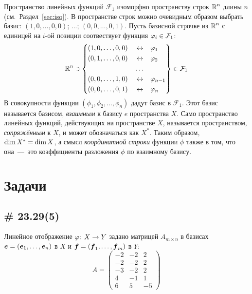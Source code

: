\documentclass[a4paper,12pt]{article}
\begin{document}
  Пространство линейных функций $\mathcal F_1$ изоморфно пространству строк $\operatorname{\mathbb R}^n$ длины $n$ (см.~Раздел~\ref{sec:iso}).
  В пространстве строк можно очевидным образом выбрать базис: $(1, 0, \ldots, 0, 0)$; ...; $(0, 0, \ldots, 0, 1)$.
  Пусть базисной строчке из $\operatorname{\mathbb R}^n$ с единицей на $i$-ой позиции соотвествует функция $\phi_i \hm\in \mathcal F_1$:
  \[
    \RR^n \ni \left\{
      \begin{aligned}
        &(1, 0, \ldots, 0, 0)            & &\leftrightarrow & &\phi_{1\hphantom{-1}}\\
        &(0, 1, \ldots, 0, 0)            & &\leftrightarrow & &\phi_{2\hphantom{-1}}\\
        &\hphantom{(0, 1, \ldots, 0, 0)} & &\ldots  & &\hphantom{\phi_{2\hphantom{-1}}}\\
        &(0, 0, \ldots, 1, 0)            & &\leftrightarrow & &\phi_{n-1}\\
        &(0, 0, \ldots, 0, 1)            & &\leftrightarrow & &\phi_{n\hphantom{-1}}
      \end{aligned}
    \right\} \in \mathcal F_1
  \]
  В совокупности функции $(\phi_1, \phi_2, \ldots, \phi_n)$ дадут базис в $\mathcal F_1$.
  Этот базис называется базисом, \emph{взаимным} к базису $e$ пространства $X$.
  Само пространство линейных функций, действующих на пространстве $X$, называется пространством, \emph{сопряжённым} к $X$, и может обозначаться как $X^{*}$.
  Таким образом, $\dim X^{*} \hm= \dim X$, а смысл \emph{координатной строки} функции $\phi$ также в том, что она~---~это коэффициенты разложения $\phi$ по взаимному базису.
  
  
  
  \section{Задачи}
  
  \subsection{\# 23.29(5)}
  
  Линейное отображение $\phi\colon X \hm\to Y$ задано матрицей $A_{m\times n}$ в базисах $\bds e \hm= (\bds e_1, \ldots, \bds e_n)$ в $X$ и $\bds f \hm= (\bds f_1, \ldots, \bds f_m)$ в $Y$:
  \[
    A = \begin{pmatrix}
      -2 & -2 & 2\\
      -2 & -2 & 2\\
      -3 & -2 & 2\\
      4 & -1 & 1\\
      6 & 5 & -5
    \end{pmatrix}
  \]
  
\end{document}
